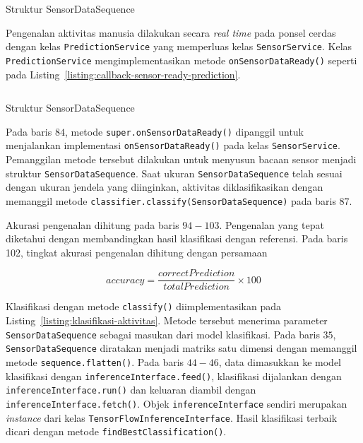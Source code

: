 \begin{listing}[h]
    \inputminted[firstline=46,firstnumber=46,lastline=56,gobble=4]{java}{../aktvtas/app/src/main/java/org/elins/aktvtas/sensor/SensorService.java}
    \caption{Struktur SensorDataSequence}
    \label{listing:callback-sensor-ready}
\end{listing}

Pengenalan aktivitas manusia dilakukan secara \textit{real time} pada ponsel cerdas dengan kelas \texttt{PredictionService} yang memperluas kelas \texttt{SensorService}. Kelas \texttt{PredictionService} mengimplementasikan metode \texttt{onSensorDataReady()} seperti pada Listing~\ref{listing:callback-sensor-ready-prediction}.

\begin{listing}[h]
    \inputminted[firstline=82,firstnumber=82,lastline=103,gobble=4]{java}{../aktvtas/app/src/main/java/org/elins/aktvtas/PredictionService.java}
    \caption{Struktur SensorDataSequence}
    \label{listing:callback-sensor-ready-prediction}
\end{listing}

Pada baris $84$, metode \texttt{super.onSensorDataReady()} dipanggil untuk menjalankan implementasi \texttt{onSensorDataReady()} pada kelas \texttt{SensorService}. Pemanggilan metode tersebut dilakukan untuk menyusun bacaan sensor menjadi struktur \texttt{SensorDataSequence}. Saat ukuran \texttt{SensorDataSequence} telah sesuai dengan ukuran jendela yang diinginkan, aktivitas diklasifikasikan dengan memanggil metode \texttt{classifier.classify(SensorDataSequence)} pada baris $87$.

Akurasi pengenalan dihitung pada baris $94-103$. Pengenalan yang tepat diketahui dengan membandingkan hasil klasifikasi dengan referensi. Pada baris 102, tingkat akurasi pengenalan dihitung dengan persamaan

\begin{equation}
    accuracy = \frac{correctPrediction}{totalPrediction} \times 100
\end{equation}

Klasifikasi dengan metode \texttt{classify()} diimplementasikan pada Listing~\ref{listing:klasifikasi-aktivitas}. Metode tersebut menerima parameter \texttt{SensorDataSequence} sebagai masukan dari model klasifikasi. Pada baris $35$, \texttt{SensorDataSequence} diratakan menjadi matriks satu dimensi dengan memanggil metode \texttt{sequence.flatten()}. Pada baris $44-46$, data dimasukkan ke model klasifikasi dengan \texttt{inferenceInterface.feed()}, klasifikasi dijalankan dengan \texttt{inferenceInterface.run()} dan keluaran diambil dengan \texttt{inferenceInterface.fetch()}. Objek \texttt{inferenceInterface} sendiri merupakan \textit{instance} dari kelas \texttt{TensorFlowInferenceInterface}. Hasil klasifikasi terbaik dicari dengan metode \texttt{findBestClassification()}.

